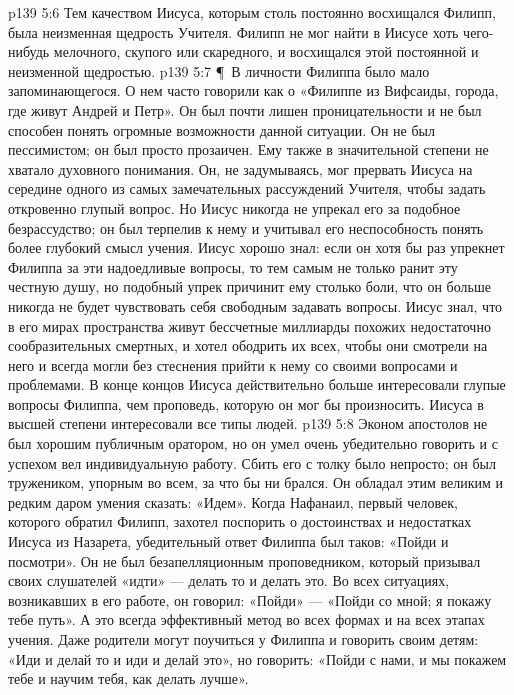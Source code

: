\vs p139 5:6 Тем качеством Иисуса, которым столь постоянно восхищался Филипп, была неизменная щедрость Учителя. Филипп не мог найти в Иисусе хоть чего\hyp{}нибудь мелочного, скупого или скаредного, и восхищался этой постоянной и неизменной щедростью.
\vs p139 5:7 \P\ В личности Филиппа было мало запоминающегося. О нем часто говорили как о «Филиппе из Вифсаиды, города, где живут Андрей и Петр». Он был почти лишен проницательности и не был способен понять огромные возможности данной ситуации. Он не был пессимистом; он был просто прозаичен. Ему также в значительной степени не хватало духовного понимания. Он, не задумываясь, мог прервать Иисуса на середине одного из самых замечательных рассуждений Учителя, чтобы задать откровенно глупый вопрос. Но Иисус никогда не упрекал его за подобное безрассудство; он был терпелив к нему и учитывал его неспособность понять более глубокий смысл учения. Иисус хорошо знал: если он хотя бы раз упрекнет Филиппа за эти надоедливые вопросы, то тем самым не только ранит эту честную душу, но подобный упрек причинит ему столько боли, что он больше никогда не будет чувствовать себя свободным задавать вопросы. Иисус знал, что в его мирах пространства живут бессчетные миллиарды похожих недостаточно сообразительных смертных, и хотел ободрить их всех, чтобы они смотрели на него и всегда могли без стеснения прийти к нему со своими вопросами и проблемами. В конце концов Иисуса действительно больше интересовали глупые вопросы Филиппа, чем проповедь, которую он мог бы произносить. Иисуса в высшей степени интересовали  все типы людей.
\vs p139 5:8 Эконом апостолов не был хорошим публичным оратором, но он умел очень убедительно говорить и с успехом вел индивидуальную работу. Сбить его с толку было непросто; он был тружеником, упорным во всем, за что бы ни брался. Он обладал этим великим и редким даром умения сказать: «Идем». Когда Нафанаил, первый человек, которого обратил Филипп, захотел поспорить о достоинствах и недостатках Иисуса из Назарета, убедительный ответ Филиппа был таков: «Пойди и посмотри». Он не был безапелляционным проповедником, который призывал своих слушателей «идти» --- делать то и делать это. Во всех ситуациях, возникавших в его работе, он говорил: «Пойди» --- «Пойди со мной; я покажу тебе путь». А это всегда эффективный метод во всех формах и на всех этапах учения. Даже родители могут поучиться у Филиппа и  говорить своим детям: «Иди и делай то и иди и делай это», но говорить: «Пойди с нами, и мы покажем тебе и научим тебя, как делать лучше».
